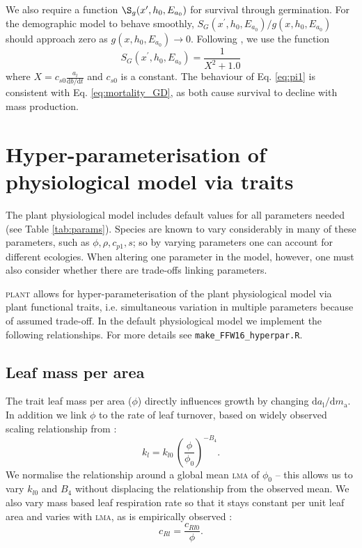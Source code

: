 \documentclass[10pt,twoside]{article}
\newcommand{\plant}{\textsc{plant}}
\begin{document}
We also require a function \(\S_g(x^\prime,h_0, E_{a_0})\) for survival
through germination. For the demographic model to behave smoothly, 
\(S_G (x^\prime,h_0, E_{a_0}) / g(x,h_0, E_{a_0})\) should approach zero as
\(g(x,h_0, E_{a_0}) \rightarrow 0\). Following \citep{Falster-2011},
we use the function
\begin{equation} \label{eq:pi1}
  S_G (x^\prime,h_0, E_{a_0}) = \frac1{X^2 + 1.0}
\end{equation}
where $X = c_{s0} \frac{a_l}{\textrm{d}b / \textrm{d}t}$ and $c_{s0}$ is a
constant. The behaviour of Eq. \ref{eq:pi1} is consistent with Eq. 
\ref{eq:mortality_GD}, as both cause survival to decline with mass production.

\section{Hyper-parameterisation of physiological model via
traits}\label{traits}

The plant physiological model includes default values for all parameters needed 
(see Table \ref{tab:params}). Species are known to vary considerably
in many of these parameters, such as $\phi,\rho,c_{p1},s$; so by varying  parameters
one can account for different ecologies. When altering one parameter in the model, however,
one must also consider whether there are trade-offs linking parameters. 

{\plant} allows for
hyper-parameterisation of the plant physiological model via plant functional traits, i.e. 
simultaneous variation in multiple parameters because of assumed trade-off. In the 
default physiological model we implement the following relationships. For more 
details see \texttt{make\_FFW16\_hyperpar.R}.

\subsection{Leaf mass per area}

The trait leaf mass per area ($\phi$) directly influences growth by changing 
$\textrm{d}a_\textrm{l} / \textrm{d}m_\textrm{a}$. In addition we  
link $\phi$ to the rate of leaf turnover,
based on widely observed scaling relationship from \citet{Wright-2004}:
$$k_l=k_{l0} \, \left(\frac{\phi}{\phi_0}\right)^{-B_4}.$$
We normalise the relationship around a global mean \textsc{lma} of $\phi_0$ -- this
allows us to vary $k_{l0}$ and $B_4$ without displacing the relationship from the 
observed mean. 
We also vary mass based leaf respiration rate so that it stays constant per unit leaf area and
varies with \textsc{lma}, as is empirically observed \citet{Wright-2004}:
$$c_{Rl}= \frac{c_{Rl0}}{\phi}.$$
\end{document}
